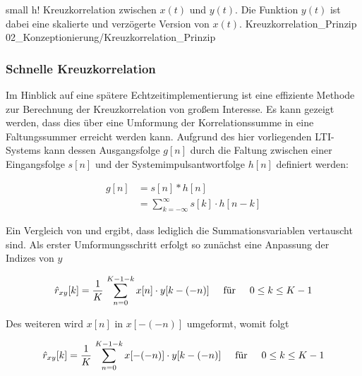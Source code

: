         {small}                 %
         {h!}             %
         {Kreuzkorrelation zwischen $x(t)$ und $y(t)$. Die Funktion $y(t)$ ist dabei eine skalierte und verzögerte Version von $x(t)$.}                %
         {Kreuzkorrelation_Prinzip}                %
         {02_Konzeptionierung/Kreuzkorrelation_Prinzip}     %



\subsubsection{Schnelle Kreuzkorrelation}
\label{subsubsec:SchnelleKreuzkorrelatio}
Im Hinblick auf eine spätere Echtzeitimplementierung ist eine effiziente Methode zur Berechnung der Kreuzkorrelation von großem Interesse. Es kann gezeigt werden, dass dies über eine Umformung der Korrelationssumme in eine Faltungssummer erreicht werden kann. 
Aufgrund des hier vorliegenden LTI-Systems kann dessen Ausgangsfolge $g[n]$ durch die Faltung zwischen einer Eingangsfolge $s[n]$ und der Systemimpulsantwortfolge $h[n]$ definiert werden:

\begin{align}\label{eq:faltungDiskret}
        g[n] & = s[n] \ast h[n] \nonumber \\
             & = \sum_{k = -\infty}^{\infty} s[k] \cdot h[n-k]
\end{align}


Ein Vergleich von  und  ergibt, dass lediglich die Summationsvariablen vertauscht sind. Als erster Umformungsschritt erfolgt so zunächst eine Anpassung der Indizes von $y$

\begin{equation}
 \hat r_{xy}[k] = \frac{1}{K} \, \sum_{n=0}^{K-1-k} x[n] \cdot y[k-(-n)] \hspace{0.5cm} \text{für} \hspace{0.5cm} 0 \leq k \leq K-1
\end{equation}

Des weiteren wird $x[n]$ in $x[-(-n)]$ umgeformt, womit folgt

\begin{equation}
 \hat r_{xy}[k] = \frac{1}{K} \, \sum_{n=0}^{K-1-k} x[-(-n)] \cdot y[k-(-n)] \hspace{0.5cm} \text{für} \hspace{0.5cm} 0 \leq k \leq K-1
\end{equation}

